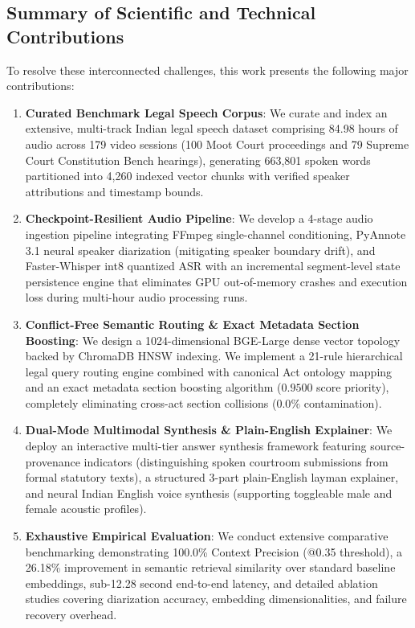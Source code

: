 \documentclass{llncs}
\begin{document}
\subsection{Summary of Scientific and Technical Contributions}
To resolve these interconnected challenges, this work presents the following major contributions:
\begin{enumerate}
    \item \textbf{Curated Benchmark Legal Speech Corpus}: We curate and index an extensive, multi-track Indian legal speech dataset comprising 84.98 hours of audio across 179 video sessions (100 Moot Court proceedings and 79 Supreme Court Constitution Bench hearings), generating 663,801 spoken words partitioned into 4,260 indexed vector chunks with verified speaker attributions and timestamp bounds.
    \item \textbf{Checkpoint-Resilient Audio Pipeline}: We develop a 4-stage audio ingestion pipeline integrating FFmpeg single-channel conditioning, PyAnnote 3.1 neural speaker diarization (mitigating speaker boundary drift), and Faster-Whisper int8 quantized ASR with an incremental segment-level state persistence engine that eliminates GPU out-of-memory crashes and execution loss during multi-hour audio processing runs.
    \item \textbf{Conflict-Free Semantic Routing \& Exact Metadata Section Boosting}: We design a 1024-dimensional BGE-Large dense vector topology backed by ChromaDB HNSW indexing. We implement a 21-rule hierarchical legal query routing engine combined with canonical Act ontology mapping and an exact metadata section boosting algorithm ($0.9500$ score priority), completely eliminating cross-act section collisions ($0.0\%$ contamination).
    \item \textbf{Dual-Mode Multimodal Synthesis \& Plain-English Explainer}: We deploy an interactive multi-tier answer synthesis framework featuring source-provenance indicators (distinguishing spoken courtroom submissions from formal statutory texts), a structured 3-part plain-English layman explainer, and neural Indian English voice synthesis (supporting toggleable male and female acoustic profiles).
    \item \textbf{Exhaustive Empirical Evaluation}: We conduct extensive comparative benchmarking demonstrating 100.0\% Context Precision (@0.35 threshold), a 26.18\% improvement in semantic retrieval similarity over standard baseline embeddings, sub-12.28 second end-to-end latency, and detailed ablation studies covering diarization accuracy, embedding dimensionalities, and failure recovery overhead.
\end{enumerate}
\end{document}
